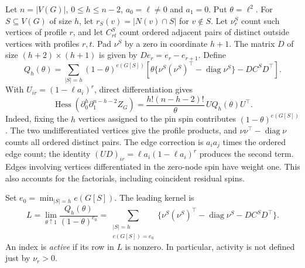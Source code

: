 \documentclass[11pt]{article}
\theoremstyle{remark}\newtheorem{remark}[theorem]{Remark}
\DeclareMathOperator{\diag}{diag}
\DeclareMathOperator{\Hess}{Hess}
\begin{document}
Let $n=|V(G)|$, $0\le h\le n-2$, $a_0=\ell\ne0$ and $a_1=0$.
Put $\theta=\ell^2$. For $S\subseteq V(G)$ of size $h$, let
$r_S(v)=|N(v)\cap S|$ for $v\notin S$.
Let $\nu^S_r$ count such vertices of profile $r$, and let $C^S_{rt}$
count ordered adjacent pairs of distinct outside vertices with
profiles $r,t$. Pad $\nu^S$ by a zero in coordinate $h+1$.
The matrix $D$ of size $(h+2)\times(h+1)$ is given by
$De_r=e_r-e_{r+1}$. Define
\begin{equation}
 Q_h(\theta)=\sum_{|S|=h}(1-\theta)^{e(G[S])}
 \left[\theta\{\nu^S(\nu^S)^\top-\diag\nu^S\}
             -DC^SD^\top\right].                       \label{eq:Q}
\end{equation}
With $U_{ir}=(1-\ell a_i)^r$, direct differentiation gives
\begin{equation}
 \Hess\!\left(\partial_0^h\partial_1^{n-h-2}Z_G\right)
 =\frac{h!(n-h-2)!}{\theta}\,UQ_h(\theta)U^\top.          \label{eq:H}
\end{equation}
Indeed, fixing the $h$ vertices assigned to the pin spin contributes
$(1-\theta)^{e(G[S])}$. The two undifferentiated vertices give
the profile products, and $\nu\nu^\top-\diag\nu$ counts all ordered
distinct pairs. The edge correction is $a_i a_j$ times the ordered
edge count; the identity $(UD)_{ir}=\ell a_i(1-\ell a_i)^r$
produces the second term. Edges involving vertices differentiated
in the zero-node spin have weight one. This also accounts for
the factorials, including coincident residual spins.

Set $e_0=\min_{|S|=h}e(G[S])$. The leading kernel is
\begin{equation}
 L=\lim_{\theta\uparrow1}\frac{Q_h(\theta)}{(1-\theta)^{e_0}}
 =\sum_{\substack{|S|=h\\e(G[S])=e_0}}
   \{\nu^S(\nu^S)^\top-\diag\nu^S-DC^SD^\top\}.           \label{eq:L}
\end{equation}
An index is \emph{active} if its row in $L$ is nonzero.
In particular, activity is not defined just by $\nu_r>0$.
\end{document}
